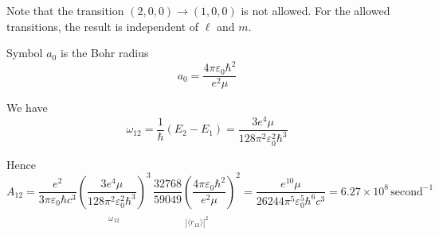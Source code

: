 \documentclass[12pt]{article}
\begin{document}
\bigskip
\noindent
Note that the transition $(2,0,0)\rightarrow(1,0,0)$ is not allowed.
For the allowed transitions, the result is independent of $\ell$ and $m$.

\bigskip
\noindent
Symbol $a_0$ is the Bohr radius
\begin{equation*}
a_0=\frac{4\pi\varepsilon_0\hbar^2}{e^2\mu}
\end{equation*}

\bigskip
\noindent
We have
\begin{equation*}
\omega_{12}=\frac{1}{\hbar}(E_2-E_1)=\frac{3e^4\mu}{128\pi^2\varepsilon_0^2\hbar^3}
\end{equation*}

\noindent
Hence
\begin{equation*}
A_{12}=\frac{e^2}{3\pi\varepsilon_0\hbar c^3}
\underset{\substack{\\[1ex]\omega_{12}}}
{\left(\frac{3e^4\mu}{128\pi^2\varepsilon_0^2\hbar^3}\right)^3}
\,
\underset{\substack{\\[1ex]|\langle r_{12}\rangle|^2}}
{\frac{32768}{59049}\left(\frac{4\pi\varepsilon_0\hbar^2}{e^2\mu}\right)^2}
=
\frac{e^{10}\mu}{26244\pi^5\varepsilon_0^5\hbar^6 c^3}
=6.27\times10^8\,\text{second}^{-1}
\end{equation*}
\end{document}
